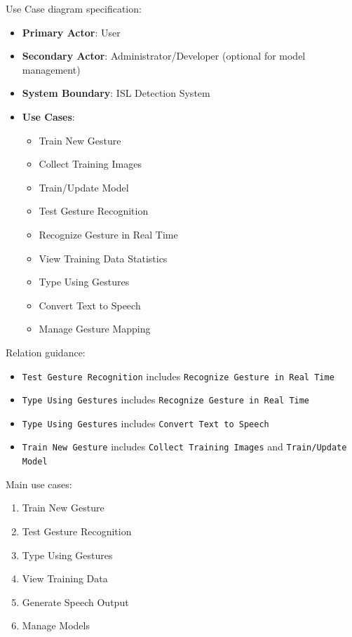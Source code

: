 Use Case diagram specification:
\begin{itemize}
    \item \textbf{Primary Actor}: User
    \item \textbf{Secondary Actor}: Administrator/Developer (optional for model management)
    \item \textbf{System Boundary}: ISL Detection System
    \item \textbf{Use Cases}:
    \begin{itemize}
        \item Train New Gesture
        \item Collect Training Images
        \item Train/Update Model
        \item Test Gesture Recognition
        \item Recognize Gesture in Real Time
        \item View Training Data Statistics
        \item Type Using Gestures
        \item Convert Text to Speech
        \item Manage Gesture Mapping
    \end{itemize}
\end{itemize}

Relation guidance:
\begin{itemize}
    \item \texttt{Test Gesture Recognition} includes \texttt{Recognize Gesture in Real Time}
    \item \texttt{Type Using Gestures} includes \texttt{Recognize Gesture in Real Time}
    \item \texttt{Type Using Gestures} includes \texttt{Convert Text to Speech}
    \item \texttt{Train New Gesture} includes \texttt{Collect Training Images} and \texttt{Train/Update Model}
\end{itemize}

Main use cases:
\begin{enumerate}
    \item Train New Gesture
    \item Test Gesture Recognition
    \item Type Using Gestures
    \item View Training Data
    \item Generate Speech Output
    \item Manage Models
\end{enumerate}

